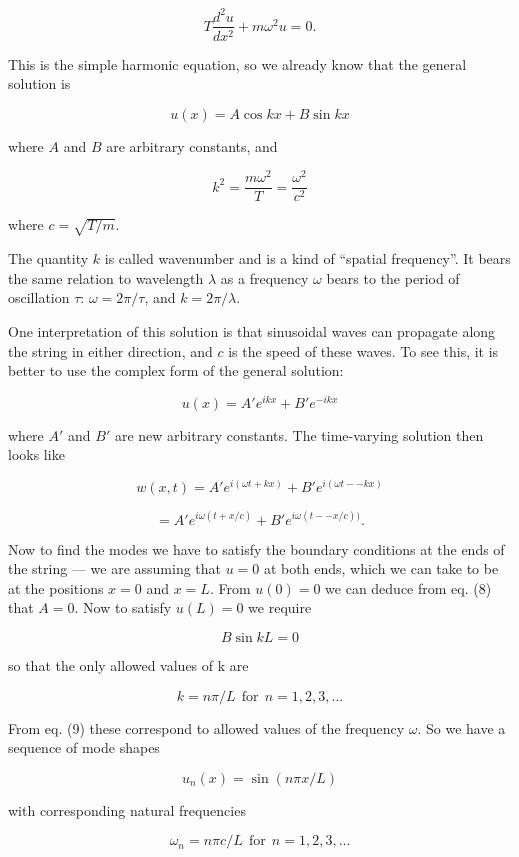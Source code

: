   $$T \dfrac{d^2u}{dx^2} + m \omega^2 u = 0. \tag{7}$$ 

  This is the simple harmonic equation, so we already know that the general 
  solution is 

  $$u(x) = A \cos kx + B \sin kx \tag{8}$$ 

  where $A$ and $B$ are arbitrary constants, and 

  $$k^2 =\dfrac{m \omega^2}{T} = \dfrac{\omega^2}{c^2} \tag{9}$$ 

  where $c=\sqrt{T/m}$. 

  The quantity $k$ is called wavenumber and is a kind of ``spatial frequency''. 
  It bears the same relation to wavelength $\lambda$ as a frequency $\omega$ 
  bears to the period of oscillation $\tau$: $\omega=2 \pi/\tau$, and $k=2 
  \pi/\lambda$. 

  One interpretation of this solution is that sinusoidal waves can propagate 
  along the string in either direction, and $c$ is the speed of these waves. To 
  see this, it is better to use the complex form of the general solution: 

  $$u(x) =A' e^{ikx} + B' e^{-ikx} \tag{10}$$ 

  where $A'$ and $B'$ are new arbitrary constants. The time-varying solution 
  then looks like 

  $$w(x,t) = A' e^{i(\omega t + kx)} + B' e^{i(\omega t -- kx)} \tag{11}$$ 

  $$=A' e^{i\omega (t + x/c)} + B' e^{i\omega (t -- x/c))}. \tag{12}$$ 

  Now to find the modes we have to satisfy the boundary conditions at the ends 
  of the string --- we are assuming that $u = 0$ at both ends, which we can 
  take to be at the positions $x = 0$ and $x = L$. From $u(0) = 0$ we can 
  deduce from eq. (8) that $A = 0$. Now to satisfy $u(L) = 0$ we require 

  $$B \sin kL = 0 \tag{12}$$ 

  so that the only allowed values of k are 

  $$k=n \pi/L \mathrm{~~for~~} n = 1, 2, 3, ... \tag{13}$$ 

  From eq. (9) these correspond to allowed values of the frequency $\omega$. So 
  we have a sequence of mode shapes 

  $$u_n(x)=\sin (n \pi x/L) \tag{14}$$ 

  with corresponding natural frequencies 

  $$\omega_n = n \pi c/L \mathrm{~~for~~} n = 1, 2, 3, ... \tag{15}$$ 